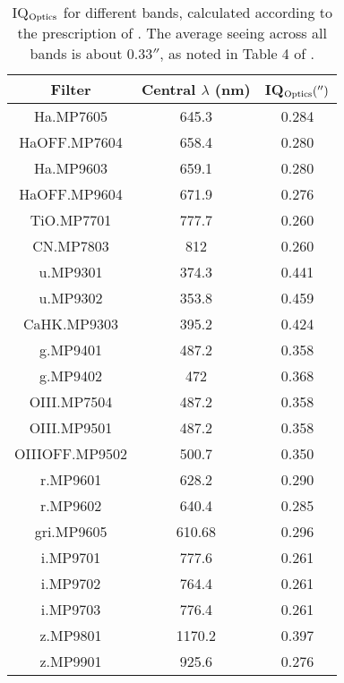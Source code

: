 \begin{enumerate}
\begin{table}
    \centering
    \caption{IQ$_{\rm Optics}$ for different bands, calculated according to the prescription of \citet{salmon2009cfht}. The average seeing across all bands is about $0.33''$, as noted in  Table 4 of \citet{salmon2009cfht}.}
    \label{tab:per_filter_contrib}
    \begin{tabular}{ccc}
        \toprule
        \toprule
        Filter & Central $\lambda$ (nm) & IQ$_{\rm Optics} ('')$ \\
        \midrule
        Ha.MP7605 &	645.3 &	0.284 \\
        HaOFF.MP7604 &	658.4 &	0.280 \\
        Ha.MP9603 &	659.1 &	0.280 \\
        HaOFF.MP9604 &	671.9 &	0.276 \\
        TiO.MP7701 &	777.7 &	0.260 \\
        CN.MP7803 &	812 &	0.260 \\
        u.MP9301 &	374.3 &	0.441 \\
        u.MP9302 &	353.8 &	0.459 \\
        CaHK.MP9303 &	395.2 &	0.424 \\
        g.MP9401 &	487.2 &	0.358 \\
        g.MP9402 &	472 &	0.368 \\
        OIII.MP7504 &	487.2 &	0.358 \\
        OIII.MP9501 &	487.2 &	0.358 \\
        OIIIOFF.MP9502 &	500.7 &	0.350 \\
        r.MP9601 &	628.2 &	0.290 \\
        r.MP9602 &	640.4 &	0.285 \\
        gri.MP9605 &	610.68 & 0.296 \\
        i.MP9701 &	777.6 &	0.261 \\
        i.MP9702 &	764.4 &	0.261 \\
        i.MP9703 &	776.4 &	0.261 \\
        z.MP9801 &	1170.2 & 0.397 \\
        z.MP9901 &	925.6 &	0.276 \\
        \bottomrule
    \end{tabular}
\end{table}


\end{enumerate}
